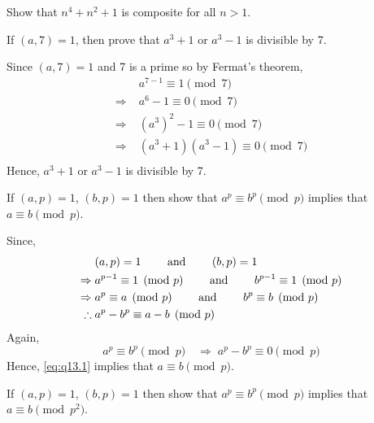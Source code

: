 \documentclass[12pt,class=book,crop=false]{standalone}
\begin{document}
\begin{qn}
    Show that $ n^4+n^2+1 $ is composite for all $ n>1 $.
\end{qn}
\begin{qn}
    If $ (a,7)=1 $, then prove that $ a^3+1$ or $a^3-1 $ is divisible by 7.
\end{qn}
\begin{soln}
    Since $ (a,7)=1 $ and 7 is a prime so by Fermat's theorem,
    \begin{align*}
        &a^{7-1}\equiv 1\pmod{7}\\
        \Rightarrow\;&a^6-1 \equiv 0\pmod{7}\\
        \Rightarrow\;&(a^3)^2-1 \equiv 0\pmod{7}\\
        \Rightarrow\;&(a^3+1)(a^3-1) \equiv 0\pmod{7}\\
    \end{align*}
    Hence, $ a^3+1$ or $a^3-1 $ is divisible by 7.
\end{soln}
\begin{qn}
    If $ (a,p)=1 $, $ (b,p)=1 $ then show that $ a^p\equiv b^p\pmod{p} $ implies that $ a\equiv b\pmod{p} $.
\end{qn}
\begin{soln}
    Since,
    \begin{align}
        &(a,p)=1\qquad \text{ and }\qquad (b,p)=1\notag\\
        \Rightarrow\;&a^{p-1}\equiv 1\pmod{p}\qquad \text{ and }\qquad b^{p-1}\equiv1\pmod{p}\notag\\
        \Rightarrow\;&a^{p}\equiv a\pmod{p}\qquad \text{ and }\qquad {b}^{p}\equiv b\pmod{p}\notag\\
        \therefore\;&a^{p}-b^p\equiv a-b\pmod{p}\label{eq:q13.1}
    \end{align}
    Again,
    \[
        a^p\equiv b^p\pmod{p}\quad \Rightarrow \; a^p-b^p\equiv 0 \pmod{p}
    \]
    Hence, \eqref{eq:q13.1} implies that $ a\equiv b\pmod{p} $.
\end{soln}
\begin{qn}
    If $ (a,p)=1 $, $ (b,p)=1 $ then show that $ a^p\equiv b^p\pmod{p} $ implies that $ a\equiv b\pmod{p^2} $.
\end{qn}
\end{document}
